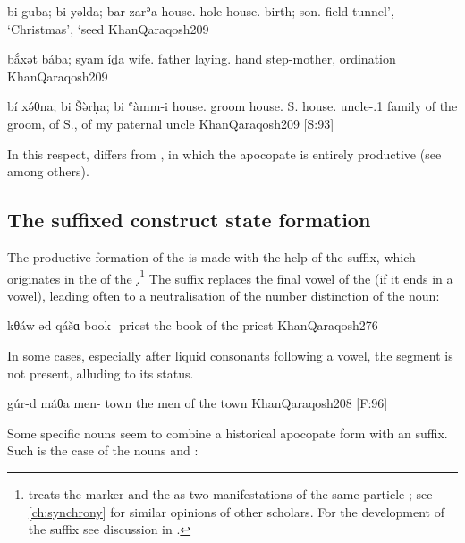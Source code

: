 {{bi}\cb{} guba; {bi}\cb{} yəlda; bar\cb{} zarʾa}
{house.\cst\cb{} hole house.\cst\cb{} birth; son.\cst\cb{} field}
{tunnel', `Christmas', `seed}
{KhanQaraqosh}{209}

{bắxət bába; syam\cb{} íḏa}
{wife.\cst{} father laying.\cst\cb{} hand}
{step-mother, ordination}
{KhanQaraqosh}{209}

{{bí} xə́θna; {bi}\cb{} Šə̀rḥa; {bi}\cb{} ʿàmm-i}
{house.\cst{} groom house.\cst\cb{} S. house.\cst\cb{} uncle-\poss.1\sg }
{family of the groom, of S., of my paternal uncle}
{KhanQaraqosh}{209 {[S:93]}}

In this respect, \Qar differs from \JZax, in which the apocopate \cst* is entirely productive (see  among others). 

\subsection{The suffixed construct state formation}

The productive formation of the \cst* is made with the help of the \mbox{} suffix, which originates in the  of the \lnk* \d.\footnote{\citeauthor{KhanQaraqosh} treats the \cst* marker and the \lnk* as two manifestations of the same  particle ; see \cref{ch:synchrony} for similar opinions of other scholars. For the development of the \cst* suffix see discussion in .} The suffix replaces the final vowel of the \prim (if it ends in a vowel), leading often to a neutralisation of the number distinction of the \prim noun:




{kθáw-əd qášɑ}
{book-\cst{} priest}
{the book of the priest}
{KhanQaraqosh}{276}

In some cases, especially after liquid consonants following a vowel, the \phonetic[ə] segment is not present, alluding  to its  status. 

{gúr-d máθa}
{men-\cst{} town}
{the men of the town}
{KhanQaraqosh}{208 {[F:96]}}

Some specific nouns seem to combine a historical apocopate \cst* form with an \ed suffix. Such is the case of the nouns  and : 



